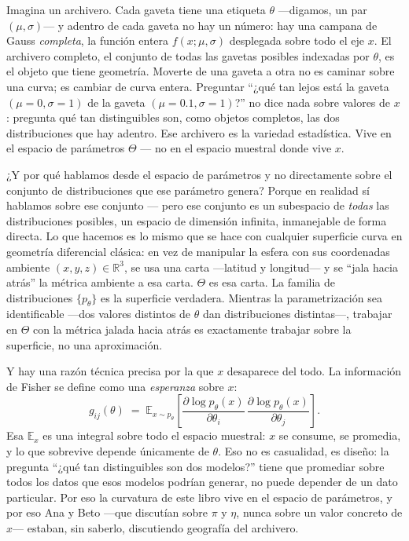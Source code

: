 Imagina un archivero. Cada gaveta tiene una etiqueta $\theta$ ---digamos, un par $(\mu,\sigma)$--- y adentro de cada gaveta no hay un número: hay una campana de Gauss \emph{completa}, la función entera $f(x;\mu,\sigma)$ desplegada sobre todo el eje $x$. El archivero completo, el conjunto de todas las gavetas posibles indexadas por $\theta$, es el objeto que tiene geometría. Moverte de una gaveta a otra no es caminar sobre una curva; es cambiar de curva entera. Preguntar ``¿qué tan lejos está la gaveta $(\mu=0,\sigma=1)$ de la gaveta $(\mu=0.1,\sigma=1)$?'' no dice nada sobre valores de $x$: pregunta qué tan distinguibles son, como objetos completos, las dos distribuciones que hay adentro. Ese archivero es la variedad estadística. Vive en el espacio de parámetros $\Theta$ --- no en el espacio muestral donde vive $x$.

¿Y por qué hablamos desde el espacio de parámetros y no directamente sobre el conjunto de distribuciones que ese parámetro genera? Porque en realidad sí hablamos sobre ese conjunto --- pero ese conjunto es un subespacio de \emph{todas} las distribuciones posibles, un espacio de dimensión infinita, inmanejable de forma directa. Lo que hacemos es lo mismo que se hace con cualquier superficie curva en geometría diferencial clásica: en vez de manipular la esfera con sus coordenadas ambiente $(x,y,z)\in\mathbb{R}^3$, se usa una carta ---latitud y longitud--- y se ``jala hacia atrás'' la métrica ambiente a esa carta. $\Theta$ es esa carta. La familia de distribuciones $\{p_\theta\}$ es la superficie verdadera. Mientras la parametrización sea identificable ---dos valores distintos de $\theta$ dan distribuciones distintas---, trabajar en $\Theta$ con la métrica jalada hacia atrás es exactamente trabajar sobre la superficie, no una aproximación.

Y hay una razón técnica precisa por la que $x$ desaparece del todo. La información de Fisher se define como una \emph{esperanza} sobre $x$:
\[
	g_{ij}(\theta) \;=\; \mathbb{E}_{x\sim p_\theta}\!\left[\frac{\partial \log p_\theta(x)}{\partial \theta_i}\,\frac{\partial \log p_\theta(x)}{\partial \theta_j}\right].
\]
Esa $\mathbb{E}_x$ es una integral sobre todo el espacio muestral: $x$ se consume, se promedia, y lo que sobrevive depende únicamente de $\theta$. Eso no es casualidad, es diseño: la pregunta ``¿qué tan distinguibles son dos modelos?'' tiene que promediar sobre todos los datos que esos modelos podrían generar, no puede depender de un dato particular. Por eso la curvatura de este libro vive en el espacio de parámetros, y por eso Ana y Beto ---que discutían sobre $\pi$ y $\eta$, nunca sobre un valor concreto de $x$--- estaban, sin saberlo, discutiendo geografía del archivero.

